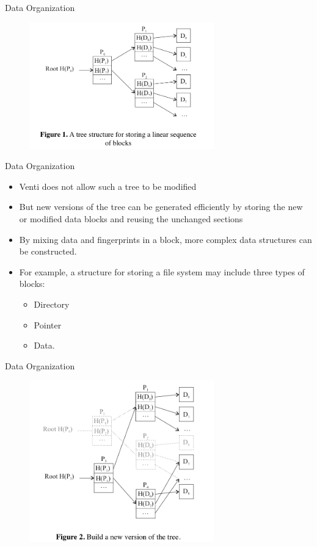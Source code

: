 \begin{frame}{Data Organization}

\begin{figure}
\includegraphics[width = 8cm]{pic1.png}
\end{figure}

\end{frame}

\begin{frame}{Data Organization}

\begin{itemize}
\itemsep1pt\parskip0pt
\item
  Venti does not allow such a tree to be modified
\item
  But new versions of the tree can be generated efficiently by storing
  the new or modified data blocks and reusing the unchanged sections
\item
  By mixing data and fingerprints in a block, more complex data
  structures can be constructed.
\item
  For example, a structure for storing a file system may include three
  types of blocks:

  \begin{itemize}
  \itemsep1pt\parskip0pt
  \item
    Directory
  \item
    Pointer
  \item
    Data.
  \end{itemize}
\end{itemize}

\end{frame}

\begin{frame}{Data Organization}

\begin{figure}
\includegraphics[width = 8cm]{pic2.png}
\end{figure}

\end{frame}


